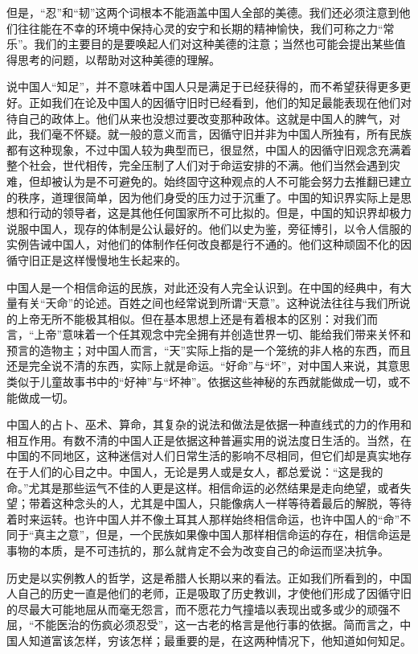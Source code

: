 \documentclass[12pt,oneside]{book}
\begin{document}
\begin{common-format}
但是，“忍”和“韧”这两个词根本不能涵盖中国人全部的美德。我们还必须注意到他们往往能在不幸的环境中保持心灵的安宁和长期的精神愉快，我们可称之力“常乐”。我们的主要目的是要唤起人们对这种美德的注意；当然也可能会提出某些值得思考的问题，以帮助对这种美德的理解。 

说中国人“知足”，并不意味着中国人只是满足于已经获得的，而不希望获得更多更好。正如我们在论及中国人的因循守旧时已经看到，他们的知足最能表现在他们对待自己的政体上。他们从来也没想过要改变那种政体。这就是中国人的脾气，对此，我们毫不怀疑。就一般的意义而言，因循守旧并非为中国人所独有，所有民族都有这种现象，不过中国人较为典型而已，很显然，中国人的因循守旧观念充满着整个社会，世代相传，完全压制了人们对于命运安排的不满。他们当然会遇到灾难，但却被认为是不可避免的。始终固守这种观点的人不可能会努力去推翻已建立的秩序，道理很简单，因为他们身受的压力过于沉重了。中国的知识界实际上是思想和行动的领导者，这是其他任何国家所不可比拟的。但是，中国的知识界却极力说服中国人，现存的体制是公认最好的。他们以史为鉴，旁征博引，以令人信服的实例告诫中国人，对他们的体制作任何改良都是行不通的。他们这种顽固不化的因循守旧正是这样慢慢地生长起来的。 

中国人是一个相信命运的民族，对此还没有人完全认识到。在中国的经典中，有大量有关“天命”的论述。百姓之间也经常说到所谓“天意”。这种说法往往与我们所说的上帝无所不能极其相似。但在基本思想上还是有着根本的区别：对我们而言，“上帝”意味着一个任其观念中完全拥有并创造世界一切、能给我们带来关怀和预言的造物主；对中国人而言，“天”实际上指的是一个笼统的非人格的东西，而且还是完全说不清的东西，实际上就是命运。“好命”与“坏”，对中国人来说，其意思类似于儿童故事书中的“好神”与“坏神”。依据这些神秘的东西就能做成一切，或不能做成一切。 

中国人的占卜、巫术、算命，其复杂的说法和做法是依据一种直线式的力的作用和相互作用。有数不清的中国人正是依据这种普遍实用的说法度日生活的。当然，在中国的不同地区，这种迷信对人们日常生活的影响不尽相同，但它们却是真实地存在于人们的心目之中。中国人，无论是男人或是女人，都总爱说：“这是我的命。”尤其是那些运气不佳的人更是这样。相信命运的必然结果是走向绝望，或者失望；带着这种念头的人，尤其是中国人，只能像病人一样等待着最后的解脱，等待着时来运转。也许中国人并不像土耳其人那样始终相信命运，也许中国人的“命”不同于“真主之意”，但是，一个民族如果像中国人那样相信命运的存在，相信命运是事物的本质，是不可违抗的，那么就肯定不会为改变自己的命运而坚决抗争。 

历史是以实例教人的哲学，这是希腊人长期以来的看法。正如我们所看到的，中国人自己的历史一直是他们的老师，正是吸取了历史教训，才使他们形成了因循守旧的尽最大可能地屈从而毫无怨言，而不愿花力气撞墙以表现出或多或少的顽强不屈，“不能医治的伤疯必须忍受”，这一古老的格言是他行事的依据。简而言之，中国人知道富该怎样，穷该怎样；最重要的是，在这两种情况下，他知道如何知足。 


\end{common-format}
\end{document}
